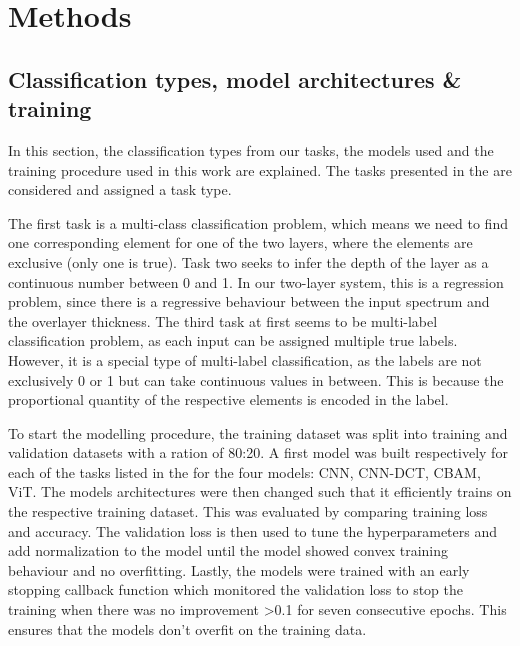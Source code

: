 
\chapter{Methods} %

\label{Chapter3} %







\section{Classification types, model architectures \& training}
In this section, the classification types from our tasks, the models used and the training procedure used in this work are explained.
The tasks presented in the  are considered and assigned a task type.

The first task is a multi-class classification problem, which means we need to find one corresponding element for one of the two layers, where the elements are exclusive (only one is true). Task two seeks to infer the depth of the layer as a continuous number between 0 and 1. In our two-layer system, this is a regression problem, since there is a regressive behaviour between the input spectrum and the overlayer thickness. 
The third task at first seems to be multi-label classification problem, as each input can be assigned multiple true labels. However, it is a special type of multi-label classification, as the labels are not exclusively 0 or 1 but can take continuous values in between. This is because the proportional quantity of the respective elements is encoded in the label. 


To start the modelling procedure, the training dataset was split into training and validation datasets with a ration of 80:20. A first model was built respectively for each of the tasks listed in the  for the four models: CNN, CNN-DCT, CBAM, ViT. The models architectures were then changed such that it efficiently trains on the respective training dataset. This was evaluated by comparing training loss and accuracy.
The validation loss is then used to tune the hyperparameters and add normalization to the model until the model showed convex training behaviour and no overfitting. Lastly, the models were trained with an early stopping callback function which monitored the validation loss to stop the training when there was no improvement >0.1 for seven consecutive epochs. This ensures that the models don't overfit on the training data.

